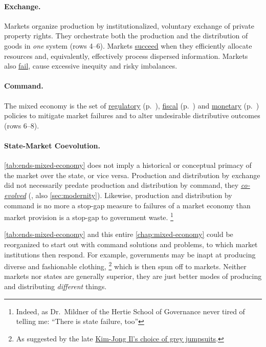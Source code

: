 \paragraph[Exchange]{Exchange.}
	\label{sec:exchange}
Markets organize production by institutionalized, voluntary exchange of private property rights.
They orchestrate both the production and the distribution of goods in \emph{one} system (rows 4--6).
Markets \hyperref[sec:market-solutions-production]{succeed} when they efficiently allocate resources and, equivalently, effectively process dispersed information.
Markets also \hyperref[sec:market-failures]{fail}, cause excessive inequity and risky imbalances.

\paragraph[Command]{Command.}
	\label{sec:command}
The mixed economy is the set of \hyperref[sec:regulatory]{regulatory} (p.~\pageref{sec:regulatory}), \hyperref[sec:fiscal]{fiscal} (p.~\pageref{sec:fiscal}) and \hyperref[sec:monetary]{monetary} (p.~\pageref{sec:monetary}) policies to mitigate market failures and to alter undesirable distributive outcomes (rows 6--8).

\paragraph{State-Market Coevolution.}
\autoref{tab:ends-mixed-economy} does not imply a historical or conceptual primacy of the market over the state, or vice versa.
Production and distribution by exchange did not necessarily predate production and distribution by command, they \hyperref[sec:modernity]{\emph{co-evolved}} (\citealt{Tilly-1985-aa}, also \autoref{sec:modernity}).
Likewise, production and distribution by command is no more a stop-gap measure to failures of a market economy than market provision is a stop-gap to government waste.
\footnote{
	Indeed, as Dr.~Mildner of the Hertie School of Governance never tired of telling me:
	``There is state failure, too''
}

\autoref{tab:ends-mixed-economy} and this entire \autoref{chap:mixed-economy} could be reorganized to start out with command solutions and problems, to which market institutions then respond.
For example, governments may be inapt at producing diverse and fashionable clothing,
\footnote{
	As suggested by the late \href{http://kimjongillookingatthings.tumblr.com/}{Kim-Jong Il's choice of grey jumpsuits}.
}
which is then spun off to markets.
Neither markets nor states are generally superior, they are just better modes of producing and distributing \emph{different} things.

